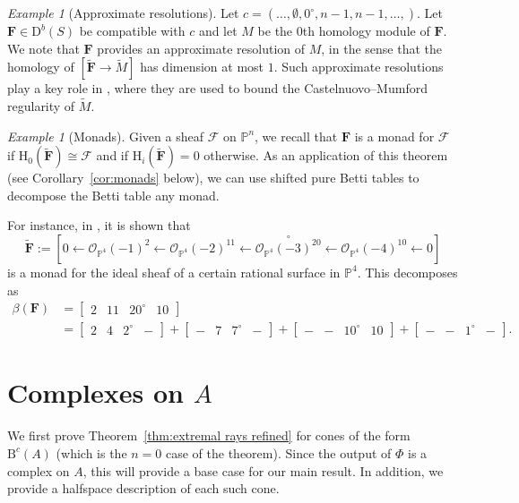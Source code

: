 \documentclass[12pt]{amsart}
\theoremstyle{definition}
\theoremstyle{remark}
\newtheorem{example}[lemma]{Example}
\newcommand{\PP}{\mathbb{P}}
\newcommand{\HH}{\mathrm{H}}
\newcommand{\bb}{c}
\newcommand{\cO}{\mathcal{O}}
\newcommand{\cF}{\mathcal{F}}
\newcommand{\FF}{\mathbf{F}}
\newcommand{\defi}[1]{\textsf{#1}} %
\newcommand{\zp}{\circ}
\newcommand{\nothing}{\emptyset}
\newcommand{\DD}{\mathrm{D}}
\newcommand{\BBQ}{\mathrm{B}}
\begin{document}
\begin{example}[Approximate resolutions]
Let $\bb=(\dots,\nothing,0^\zp,n-1,n-1,\dots,)$.   Let $\FF\in \DD^b(S)$ be compatible with $\bb$ and let $M$ be the $0$th homology module of $\FF$.  We note that $\FF$ provides an approximate resolution of $M$, in the sense that the homology of $[\widetilde{\FF}\to \widetilde{M}]$ has dimension at most $1$.  Such approximate resolutions play a key role in \cite[Lemma~1.6]{gruson-lazarsfeld-peskine}, where they are used to bound the Castelnuovo--Mumford regularity of $\widetilde{M}$.
\end{example}

\begin{example}[Monads]\label{ex:monads}
Given a sheaf $\cF$ on $\PP^n$, we recall that $\FF$ is a \defi{monad} for $\cF$ if $\HH_0(\widetilde{\FF})\cong \cF$ and if $\HH_i(\widetilde{\FF})=0$ otherwise.  
As an application of this theorem (see Corollary~\ref{cor:monads} below), we can use shifted pure Betti tables to decompose the Betti table any monad.  

For instance, in \cite[Example 8.2]{eis-floy-schrey}, it is shown that
\[
\widetilde{\FF}:=\left[0\gets \cO_{\PP^4}(-1)^2 \gets  \cO_{\PP^4}(-2)^{11}\gets \overset{\zp}{\cO_{\PP^4}(-3)^{20}}\gets \cO_{\PP^4}(-4)^{10}\gets 0 \right]
\]
is a monad for the ideal sheaf of a certain rational surface in $\PP^4$.  This decomposes as
\begin{align*}
\beta(\FF)&=
\begin{bmatrix}
2&11&20^\zp&10
\end{bmatrix}
\\
&=
\begin{bmatrix}
2&4&2^\zp&-
\end{bmatrix}
+
\begin{bmatrix}
-&7&7^\zp&-
\end{bmatrix}
+
\begin{bmatrix}
-&-&10^\zp&10
\end{bmatrix}
+
\begin{bmatrix}
-&-&1^\zp&-
\end{bmatrix}.
\end{align*}
\end{example}







\section{Complexes on $A$}\label{sec:A}
We first prove Theorem~\ref{thm:extremal rays refined} for cones of the form $\BBQ^{\bb}(A)$ (which is the $n=0$ case of the theorem).
Since the output of $\Phi$ is a complex on $A$, this will provide a base case for our main result.  In addition, we provide a halfspace description of each such cone.
\end{document}
